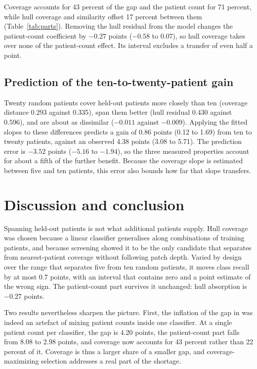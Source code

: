 \noindent Coverage accounts for 43 percent of the gap and the patient count for 71 percent, while hull coverage and similarity offset 17 percent between them (Table~\ref{tab:parts}). Removing the hull residual from the model changes the patient-count coefficient by $-0.27$ points ($-0.58$ to 0.07), so hull coverage takes over none of the patient-count effect. Its interval excludes a transfer of even half a point.

\subsection{Prediction of the ten-to-twenty-patient gain}
\label{sec:prediction-results}
Twenty random patients cover held-out patients more closely than ten (coverage distance 0.293 against 0.335), span them better (hull residual 0.430 against 0.596), and are about as dissimilar ($-0.011$ against $-0.009$). Applying the fitted slopes to these differences predicts a gain of 0.86 points (0.12 to 1.69) from ten to twenty patients, against an observed 4.38 points (3.08 to 5.71). The prediction error is $-3.52$ points ($-5.16$ to $-1.94$), so the three measured properties account for about a fifth of the further benefit. Because the coverage slope is estimated between five and ten patients, this error also bounds how far that slope transfers.

\section{Discussion and conclusion}
\label{sec:discussion}
Spanning held-out patients is not what additional patients supply. Hull coverage was chosen because a linear classifier generalises along combinations of training patients, and because screening showed it to be the only candidate that separates from nearest-patient coverage without following patch depth. Varied by design over the range that separates five from ten random patients, it moves class recall by at most 0.7 points, with an interval that contains zero and a point estimate of the wrong sign. The patient-count part survives it unchanged: hull absorption is $-0.27$ points.

Two results nevertheless sharpen the picture. First, the inflation of the gap in \citet{queisler2026shortageDecomposition} was indeed an artefact of mixing patient counts inside one classifier. At a single patient count per classifier, the gap is 4.20 points, the patient-count part falls from 8.08 to 2.98 points, and coverage now accounts for 43 percent rather than 22 percent of it. Coverage is thus a larger share of a smaller gap, and coverage-maximizing selection \citep{queisler2026shortageSelection} addresses a real part of the shortage.

